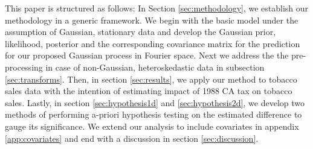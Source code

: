 \documentclass{article}
\begin{document}
This paper is structured as follows: In Section \ref{sec:methodology}, we establish our methodology in a generic framework.
We begin with the basic model under the assumption of Gaussian, stationary data and develop the Gaussian prior, likelihood, posterior
and the corresponding covariance matrix for the prediction for our proposed Gaussian process in Fourier space. Next we address the 
the pre-processing in case of non-Gaussian, heteroskedastic data in subsection \ref{sec:transforms}. Then, in section \ref{sec:results},
we apply our method to tobacco sales data with the intention of estimating impact of 1988 CA tax on tobacco sales. Lastly, in 
section \ref{sec:hypothesis1d} and \ref{sec:hypothesis2d}, we develop two methods of performing a-priori hypothesis testing on the
estimated difference to gauge its significance. We extend our analysis to include covariates in appendix \ref{app:covariates} and
end with a discussion in section \ref{sec:discussion}.






\end{document}
